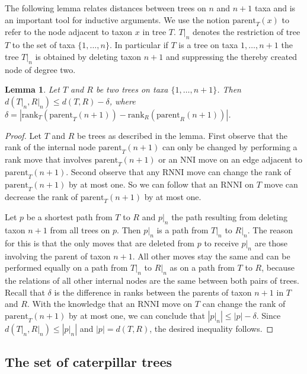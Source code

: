 \documentclass{amsart}
\newcommand{\parent}{\mathrm{parent}}
\newcommand{\rank}{\mathrm{rank}}
\newcommand{\nni}{\mathrm{NNI}}
\newcommand{\rnni}{\mathrm{RNNI}}
\newtheorem{lemma}[definition]{Lemma}
\begin{document}
The following lemma relates distances between trees on $n$ and $n+1$ taxa and is an important tool for inductive arguments.
We use the notion $\parent_T(x)$ to refer to the node adjacent to taxon $x$ in tree $T$.
$T{\big|}_n$ denotes the restriction of tree $T$ to the set of taxa $\{1, \ldots, n\}$.
In particular if $T$ is a tree on taxa $1, \ldots, n+1$ the tree $T{\big|}_n$ is obtained by deleting taxon $n+1$ and suppressing the thereby created node of degree two.

\begin{lemma}
Let $T$ and $R$ be two trees on taxa $\{1, \ldots, n+1\}$.
Then $d(T{\big|}_n, R{\big|}_n) \leq d(T,R) - \delta$, where $\delta = |\rank_T(\parent_T(n+1)) - \rank_R(\parent_R(n+1))|$.
\label{lemma:distance_delete_taxon}
\end{lemma}

\begin{proof}
Let $T$ and $R$ be trees as described in the lemma.
First observe that the rank of the internal node $\parent_T(n+1)$ can only be changed by performing a rank move that involves $\parent_T(n+1)$ or an $\nni$ move on an edge adjacent to $\parent_T(n+1)$.
Second observe that any $\rnni$ move can change the rank of $\parent_T(n+1)$ by at most one.
So we can follow that an $\rnni$ on $T$ move can decrease the rank of $\parent_T(n+1)$ by at most one.

Let $p$ be a shortest path from $T$ to $R$ and $p{\big|}_n$ the path resulting from deleting taxon $n+1$ from all trees on $p$.
Then $p{\big|}_n$ is a path from $T{\big|}_n$ to $R{\big|}_n$.
The reason for this is that the only moves that are deleted from $p$ to receive $p{\big|}_n$ are those involving the parent of taxon $n+1$.
All other moves stay the same and can be performed equally on a path from $T{\big|}_n$ to $R{\big|}_n$ as on a path from $T$ to $R$, because the relations of all other internal nodes are the same between both pairs of trees.
Recall that $\delta$ is the difference in ranks between the parents of taxon $n+1$ in $T$ and $R$.
With the knowledge that an $\rnni$ move on $T$ can change the rank of $\parent_T(n+1)$ by at most one, we can conclude that $|p{\big|}_n| \leq |p| - \delta$.
Since $d(T{\big|}_n,R{\big|}_n) \leq |p{\big|}_n|$ and $|p| = d(T,R)$, the desired inequality follows.
\end{proof}


\subsection{The set of caterpillar trees}
\label{section:caterpillar_convex}
\end{document}
